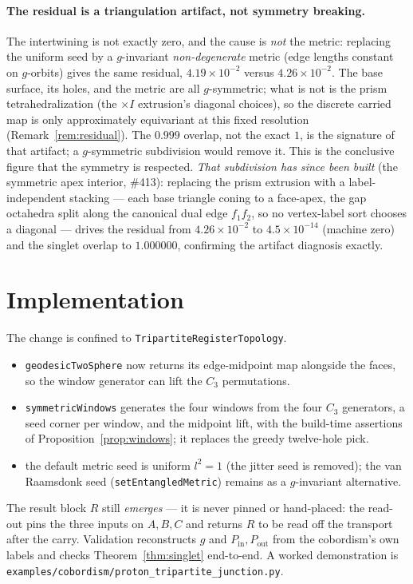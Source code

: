\documentclass[11pt]{article}
\theoremstyle{definition}
\newcommand{\Pin}{P_{\mathrm{in}}}
\newcommand{\Pout}{P_{\mathrm{out}}}
\begin{document}
\paragraph{The residual is a triangulation artifact, not symmetry breaking.} The
intertwining is not exactly zero, and the cause is \emph{not} the metric: replacing the
uniform seed by a $g$-invariant \emph{non-degenerate} metric (edge lengths constant on
$g$-orbits) gives the same residual, $4.19\times10^{-2}$ versus $4.26\times10^{-2}$.
The base surface, its holes, and the metric are all $g$-symmetric; what is not is the
prism tetrahedralization (the $\times I$ extrusion's diagonal choices), so the discrete
carried map is only approximately equivariant at this fixed resolution
(Remark~\ref{rem:residual}). The $0.999$ overlap, not the exact $1$, is the signature
of that artifact; a $g$-symmetric subdivision would remove it. This is the conclusive
figure that the symmetry is respected. \emph{That subdivision has since been built}
(the symmetric apex interior, \#413): replacing the prism extrusion with a
label-independent stacking --- each base triangle coning to a face-apex, the gap
octahedra split along the canonical dual edge $f_1 f_2$, so no vertex-label sort chooses
a diagonal --- drives the residual from $4.26\times10^{-2}$ to $4.5\times10^{-14}$
(machine zero) and the singlet overlap to $1.000000$, confirming the artifact diagnosis
exactly.

\section{Implementation}
\label{sec:impl}

The change is confined to \texttt{TripartiteRegisterTopology}.
\begin{itemize}[nosep]
  \item \texttt{geodesicTwoSphere} now returns its edge-midpoint map alongside the
        faces, so the window generator can lift the $C_3$ permutations.
  \item \texttt{symmetricWindows} generates the four windows from the four $C_3$
        generators, a seed corner per window, and the midpoint lift, with the
        build-time assertions of Proposition~\ref{prop:windows}; it replaces the greedy
        twelve-hole pick.
  \item the default metric seed is uniform $l^2=1$ (the jitter seed is removed); the van
        Raamsdonk seed (\texttt{setEntangledMetric}) remains as a $g$-invariant
        alternative.
\end{itemize}
The result block $R$ still \emph{emerges} --- it is never pinned or hand-placed: the
read-out pins the three inputs on $A,B,C$ and returns $R$ to be read off the transport
after the carry. Validation reconstructs $g$ and $\Pin,\Pout$ from the cobordism's own
labels and checks Theorem~\ref{thm:singlet} end-to-end. A worked demonstration is
\nolinkurl{examples/cobordism/proton_tripartite_junction.py}.
\end{document}
